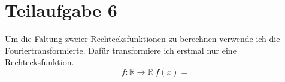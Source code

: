 

\section{Teilaufgabe 6}
Um die Faltung zweier Rechtecksfunktionen zu berechnen verwende ich die Fouriertransformierte. Dafür transformiere ich erstmal nur eine Rechtecksfunktion.
\begin{equation}
    f:\mathbb{R} \longrightarrow \mathbb{R}  \; f(x) = 
\end{equation}